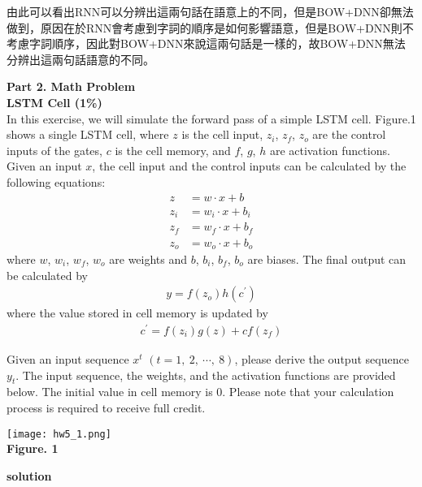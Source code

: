 \documentclass{article}
\begin{document}
由此可以看出RNN可以分辨出這兩句話在語意上的不同，但是BOW+DNN卻無法做到，原因在於RNN會考慮到字詞的順序是如何影響語意，但是BOW+DNN則不考慮字詞順序，因此對BOW+DNN來說這兩句話是一樣的，故BOW+DNN無法分辨出這兩句話語意的不同。\\

\bigskip

\noindent
{\bf \LARGE Part 2. Math Problem}\\

\noindent
{\bf \Large LSTM Cell (1\%)}\\

In this exercise, we will simulate the forward pass of a simple LSTM cell. Figure.1 shows a single LSTM cell, where $z$ is the cell input, $z_i$, $z_f$, $z_o$ are the control inputs of the gates, $c$ is the cell memory, and $f$, $g$, $h$ are activation functions. Given an input $x$, the cell input and the control inputs can be calculated by the following equations:
\begin{align*}
    z &= w \cdot x + b\\
    z_i &= w_i \cdot x + b_i\\
    z_f &= w_f \cdot x + b_f\\
    z_o &= w_o \cdot x + b_o
\end{align*}
where $w$, $w_i$, $w_f$, $w_o$ are weights and $b$, $b_i$, $b_f$, $b_o$ are biases. The final output can be calculated by
\begin{align*}
    y = f(z_o) h(c^\prime)
\end{align*}
where the value stored in cell memory is updated by
\begin{align*}
    c^\prime = f(z_i) g(z) + c f(z_f)
\end{align*}

Given an input sequence $x^t$ $(t = 1,\ 2,\ \cdots,\ 8)$, please derive the output sequence $y_t$. The input sequence, the weights, and the activation functions are provided below. The initial value in cell memory is 0. Please note that your calculation process is required to receive full credit.

\begin{center}
    \texttt{[image: hw5\_1.png]}\\
    {\bf Figure. 1}
\end{center}

\noindent
{\bf \large solution}\\
\end{document}
